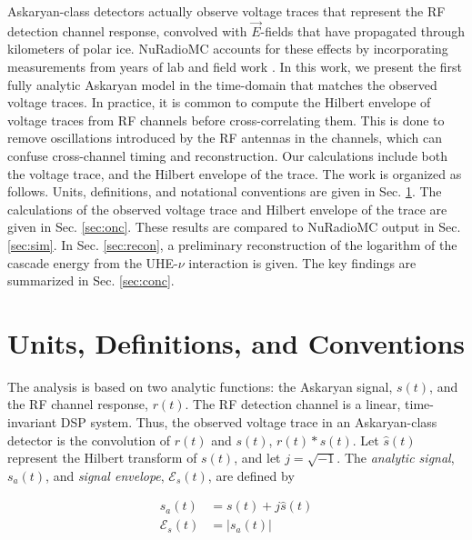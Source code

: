 \documentclass[amsmath,amssymb,aps,prd,10pt,twocolumn,showkeys]{revtex4}
\begin{document}
Askaryan-class detectors actually observe voltage traces that represent the RF detection channel response, convolved with $\vec{E}$-fields that have propagated through kilometers of polar ice.  NuRadioMC accounts for these effects by incorporating measurements from years of lab and field work \cite{10.1016/j.astropartphys.2014.09.002,10.3189/2015jog14j214,10.3189/2015jog15j057,saltzberg,10.1103/PhysRevD.74.043002,ask_ice,10.1140/epjc/s10052-020-7612-8,Barwick:2018497,ALLISON201963,10.1088/1748-0221/15/09/p09039,deaconu2018measurements-182,welling2024brief-b47}.  In this work, we present the first fully analytic Askaryan model in the time-domain that matches the observed voltage traces.  In practice, it is common to compute the Hilbert envelope of voltage traces from RF channels before cross-correlating them.  This is done to remove oscillations introduced by the RF antennas in the channels, which can confuse cross-channel timing and reconstruction.  Our calculations include both the voltage trace, and the Hilbert envelope of the trace.  The work is organized as follows.  Units, definitions, and notational conventions are given in Sec. \ref{sec:unit}.  The calculations of the observed voltage trace and Hilbert envelope of the trace are given in Sec. \ref{sec:onc}.  These results are compared to NuRadioMC output in Sec. \ref{sec:sim}.  In Sec. \ref{sec:recon}, a preliminary reconstruction of the logarithm of the cascade energy from the UHE-$\nu$ interaction is given.  The key findings are summarized in Sec. \ref{sec:conc}.

\section{Units, Definitions, and Conventions}
\label{sec:unit}

The analysis is based on two analytic functions: the Askaryan signal, $s(t)$, and the RF channel response, $r(t)$.  The RF detection channel is a linear, time-invariant DSP system.  Thus, the observed voltage trace in an Askaryan-class detector is the convolution of $r(t)$ and $s(t)$, $r(t) * s(t)$.  Let $\hat{s}(t)$ represent the Hilbert transform of $s(t)$, and let $j=\sqrt{-1}$.  The \textit{analytic signal}, $s_a(t)$, and \textit{signal envelope}, $\mathcal{E}_s(t)$, are defined by 

\begin{align}
s_a(t) &= s(t) + j\hat{s}(t) \\
\mathcal{E}_s(t) &= |s_a(t)|
\end{align}
\end{document}
